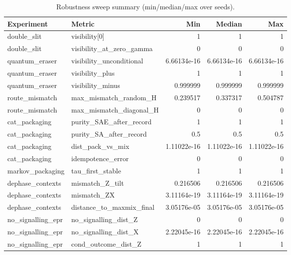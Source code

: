 \begin{table}[t]
  \centering
  \begin{tabular}{l l r r r}
    \toprule
    Experiment & Metric & Min & Median & Max \\
    \midrule
    double\_slit & visibility[0] & 1 & 1 & 1 \\
    double\_slit & visibility\_at\_zero\_gamma & 0 & 0 & 0 \\
    quantum\_eraser & visibility\_unconditional & 6.66134e-16 & 6.66134e-16 & 6.66134e-16 \\
    quantum\_eraser & visibility\_plus & 1 & 1 & 1 \\
    quantum\_eraser & visibility\_minus & 0.999999 & 0.999999 & 0.999999 \\
    route\_mismatch & max\_mismatch\_random\_H & 0.239517 & 0.337317 & 0.504787 \\
    route\_mismatch & max\_mismatch\_diagonal\_H & 0 & 0 & 0 \\
    cat\_packaging & purity\_SAE\_after\_record & 1 & 1 & 1 \\
    cat\_packaging & purity\_SA\_after\_record & 0.5 & 0.5 & 0.5 \\
    cat\_packaging & dist\_pack\_vs\_mix & 1.11022e-16 & 1.11022e-16 & 1.11022e-16 \\
    cat\_packaging & idempotence\_error & 0 & 0 & 0 \\
    markov\_packaging & tau\_first\_stable & 1 & 1 & 1 \\
    dephase\_contexts & mismatch\_Z\_tilt & 0.216506 & 0.216506 & 0.216506 \\
    dephase\_contexts & mismatch\_ZX & 3.11164e-19 & 3.11164e-19 & 3.11164e-19 \\
    dephase\_contexts & distance\_to\_maxmix\_final & 3.05176e-05 & 3.05176e-05 & 3.05176e-05 \\
    no\_signalling\_epr & no\_signalling\_dist\_Z & 0 & 0 & 0 \\
    no\_signalling\_epr & no\_signalling\_dist\_X & 2.22045e-16 & 2.22045e-16 & 2.22045e-16 \\
    no\_signalling\_epr & cond\_outcome\_dist\_Z & 1 & 1 & 1 \\
    \bottomrule
  \end{tabular}
  \caption{Robustness sweep summary (min/median/max over seeds).}
  \label{tab:robustness-sweep}
\end{table}
